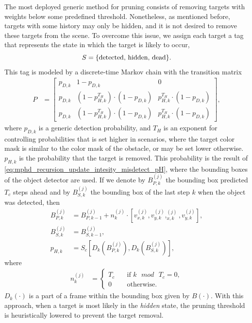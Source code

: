 The most deployed generic method for pruning consists of removing targets with weights below some predefined threshold. Nonetheless, as mentioned before, targets with some history may only be hidden, and it is not desired to remove these targets from the scene. To overcome this issue, we assign each target a tag that represents the state in which the target is likely to occur,
\begin{equation}
  S = \{\text{detected, hidden, dead}\}.
  \notag
\end{equation}
This tag is modeled by a discrete-time Markov chain with the transition matrix
\begin{align}
  \label{eq:mphd_transition_matrix}
  P &= \begin{bmatrix}
         p_{D,k} & 1-p_{D,k} & 0 \\
         p_{D,k} & (1-p_{H,k}^{T_H}) \cdot (1-p_{D,k}) & p_{H,k}^{T_H} \cdot (1- p_{D,k}) \\
         p_{D,k} & (1-p_{H,k}^{T_H}) \cdot (1-p_{D,k}) & p_{H,k}^{T_H} \cdot (1- p_{D,k})
  \end{bmatrix},
\end{align}
where $p_{D,k}$ is a generic detection probability, and $T_H$ is an exponent for controlling probabilities that is
set higher in scenarios, where the target color mask is similar to the color mask of the obstacle, or may be set
lower otherwise. $p_{H,k}$ is the probability that the target is removed. This probability is the result of \eqref{eq:mphd_recursion_update_intesity_misdetect_pH}, where the bounding boxes of the object detector are used.
If we denote by $B_{P,k}^{(j)}$ the bounding box predicted $T_c$ steps ahead and by $B_{S,k}^{(j)}$ the bounding box of the last step $k$ when the object was detected, then
\begin{align}
  B_{P,k}^{(j)} &= B_{P,k-1}^{(j)} + n_k^{(j)}\cdot [v_{x,{k}}^{(j)}, v_{y,{k}}^{(j)}, _{x,{k}}^{(j)}, v_{y,{k}}^{(j)}], \label{eq:mphd_bbox_shift}\\
  B_{S,k}^{(j)} &= B_{S,k-1}^{(j)}, \\
  p_{H,k} &= S_c\left[D_k(B_{P,k}^{(j)}), D_k(B_{S,k}^{(j)})\right], \label{eq:mphd_recursion_update_intesity_misdetect_pH}
\end{align}
where
\begin{align}
  \label{eq:mphd_recursion_update_intesity_misdetect_T_move}
  n_k^{(j)} &=
  \begin{cases}
    T_c \quad & \text{if } k\text{ } mod \text{ }T_c = 0,  \\
    0 \quad & \text{otherwise.}
  \end{cases}
\end{align}
$D_k(\cdot)$ is a part of a frame within the bounding box given by $B(\cdot)$. With this approach, when a target is most likely in the \textit{hidden} state, the pruning threshold is heuristically lowered to prevent the target removal.

